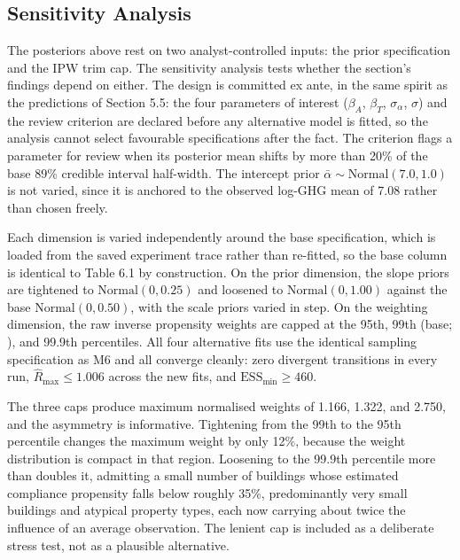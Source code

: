 \subsection{Sensitivity Analysis}

The posteriors above rest on two analyst-controlled inputs: the prior specification and the IPW trim cap. The sensitivity analysis tests whether the section's findings depend on either. The design is committed ex ante, in the same spirit as the predictions of Section 5.5: the four parameters of interest ($\beta_A$, $\beta_T$, $\sigma_\alpha$, $\sigma$) and the review criterion are declared before any alternative model is fitted, so the analysis cannot select favourable specifications after the fact. The criterion flags a parameter for review when its posterior mean shifts by more than 20\% of the base 89\% credible interval half-width. The intercept prior $\bar{\alpha} \sim \text{Normal}(7.0, 1.0)$ is not varied, since it is anchored to the observed log-GHG mean of 7.08 rather than chosen freely.

Each dimension is varied independently around the base specification, which is loaded from the saved experiment trace rather than re-fitted, so the base column is identical to Table 6.1 by construction. On the prior dimension, the slope priors are tightened to $\text{Normal}(0, 0.25)$ and loosened to $\text{Normal}(0, 1.00)$ against the base $\text{Normal}(0, 0.50)$, with the scale priors varied in step. On the weighting dimension, the raw inverse propensity weights are capped at the 95th, 99th (base; ), and 99.9th percentiles. All four alternative fits use the identical sampling specification as M6 and all converge cleanly: zero divergent transitions in every run, $\hat{R}_{\max} \leq 1.006$ across the new fits, and $\text{ESS}_{\min} \geq 460$.

The three caps produce maximum normalised weights of 1.166, 1.322, and 2.750, and the asymmetry is informative. Tightening from the 99th to the 95th percentile changes the maximum weight by only 12\%, because the weight distribution is compact in that region. Loosening to the 99.9th percentile more than doubles it, admitting a small number of buildings whose estimated compliance propensity falls below roughly 35\%, predominantly very small buildings and atypical property types, each now carrying about twice the influence of an average observation. The lenient cap is included as a deliberate stress test, not as a plausible alternative.

